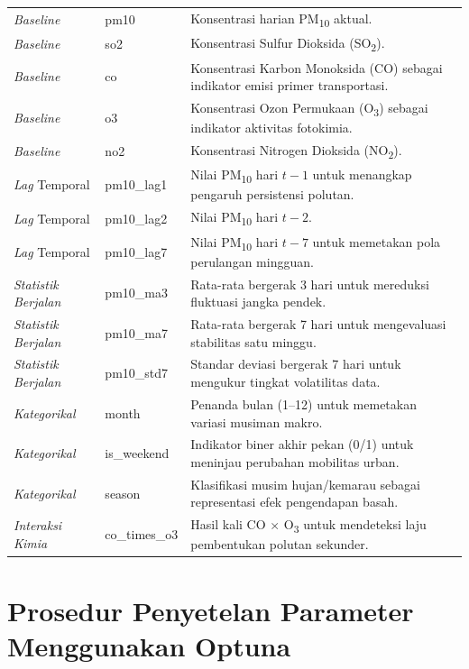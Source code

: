 \begin{longtable}{>{\raggedright\arraybackslash}p{2.5cm}
                   >{\raggedright\arraybackslash}p{2.3cm}
                   >{\raggedright\arraybackslash}p{8.1cm}}
\textit{Baseline} & pm10 & Konsentrasi harian PM\textsubscript{10} aktual. \\
\textit{Baseline} & so2 & Konsentrasi Sulfur Dioksida (SO\textsubscript{2}). \\
\textit{Baseline} & co & Konsentrasi Karbon Monoksida (CO) sebagai indikator emisi primer transportasi. \\
\textit{Baseline} & o3 & Konsentrasi Ozon Permukaan (O\textsubscript{3}) sebagai indikator aktivitas fotokimia. \\
\textit{Baseline} & no2 & Konsentrasi Nitrogen Dioksida (NO\textsubscript{2}). \\
\textit{Lag} Temporal & pm10\_lag1 & Nilai PM\textsubscript{10} hari $t-1$ untuk menangkap pengaruh persistensi polutan. \\
\textit{Lag} Temporal & pm10\_lag2 & Nilai PM\textsubscript{10} hari $t-2$. \\
\textit{Lag} Temporal & pm10\_lag7 & Nilai PM\textsubscript{10} hari $t-7$ untuk memetakan pola perulangan mingguan. \\
\textit{Statistik Berjalan} & pm10\_ma3 & Rata-rata bergerak 3 hari untuk mereduksi fluktuasi jangka pendek. \\
\textit{Statistik Berjalan} & pm10\_ma7 & Rata-rata bergerak 7 hari untuk mengevaluasi stabilitas satu minggu. \\
\textit{Statistik Berjalan} & pm10\_std7 & Standar deviasi bergerak 7 hari untuk mengukur tingkat volatilitas data. \\
\textit{Kategorikal} & month & Penanda bulan (1--12) untuk memetakan variasi musiman makro. \\
\textit{Kategorikal} & is\_weekend & Indikator biner akhir pekan (0/1) untuk meninjau perubahan mobilitas urban. \\
\textit{Kategorikal} & season & Klasifikasi musim hujan/kemarau sebagai representasi efek pengendapan basah. \\
\textit{Interaksi Kimia} & co\_times\_o3 & Hasil kali CO $\times$ O\textsubscript{3} untuk mendeteksi laju pembentukan polutan sekunder. \\
\end{longtable}

\section{Prosedur Penyetelan Parameter Menggunakan Optuna}

